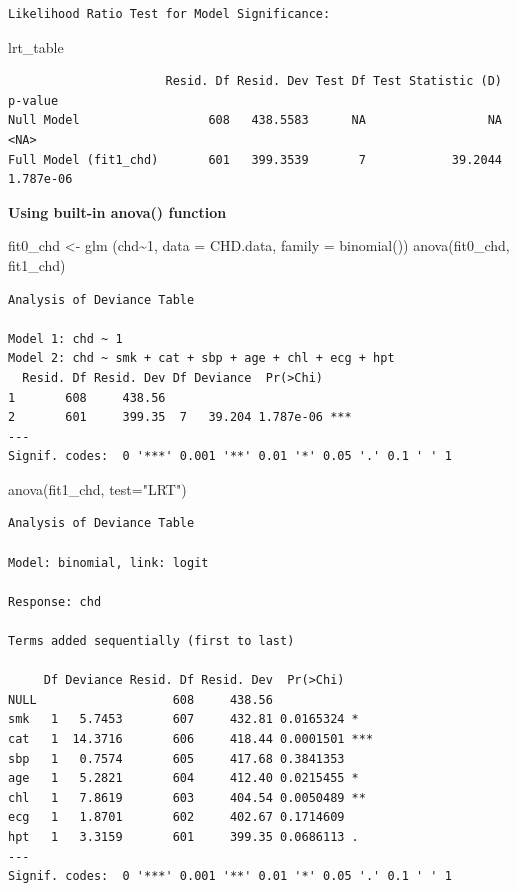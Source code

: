 \documentclass[
  letterpaper,
]{scrbook}
\newenvironment{Shaded}{\begin{snugshade}}{\end{snugshade}}
\newcommand{\AttributeTok}[1]{\textcolor[rgb]{0.40,0.45,0.13}{#1}}
\newcommand{\DecValTok}[1]{\textcolor[rgb]{0.68,0.00,0.00}{#1}}
\newcommand{\FunctionTok}[1]{\textcolor[rgb]{0.28,0.35,0.67}{#1}}
\newcommand{\NormalTok}[1]{\textcolor[rgb]{0.00,0.23,0.31}{#1}}
\newcommand{\OtherTok}[1]{\textcolor[rgb]{0.00,0.23,0.31}{#1}}
\newcommand{\SpecialCharTok}[1]{\textcolor[rgb]{0.37,0.37,0.37}{#1}}
\newcommand{\StringTok}[1]{\textcolor[rgb]{0.13,0.47,0.30}{#1}}
\begin{document}
\begin{verbatim}
Likelihood Ratio Test for Model Significance:
\end{verbatim}

\begin{Shaded}
\begin{Highlighting}[]
\NormalTok{lrt\_table}
\end{Highlighting}
\end{Shaded}

\begin{verbatim}
                      Resid. Df Resid. Dev Test Df Test Statistic (D)   p-value
Null Model                  608   438.5583      NA                 NA      <NA>
Full Model (fit1_chd)       601   399.3539       7            39.2044 1.787e-06
\end{verbatim}

\textbf{Using built-in anova() function}

\begin{Shaded}
\begin{Highlighting}[]
\NormalTok{fit0\_chd }\OtherTok{\textless{}{-}} \FunctionTok{glm}\NormalTok{ (chd}\SpecialCharTok{\textasciitilde{}}\DecValTok{1}\NormalTok{, }\AttributeTok{data =}\NormalTok{ CHD.data, }\AttributeTok{family =} \FunctionTok{binomial}\NormalTok{())}
\FunctionTok{anova}\NormalTok{(fit0\_chd, fit1\_chd)}
\end{Highlighting}
\end{Shaded}

\begin{verbatim}
Analysis of Deviance Table

Model 1: chd ~ 1
Model 2: chd ~ smk + cat + sbp + age + chl + ecg + hpt
  Resid. Df Resid. Dev Df Deviance  Pr(>Chi)    
1       608     438.56                          
2       601     399.35  7   39.204 1.787e-06 ***
---
Signif. codes:  0 '***' 0.001 '**' 0.01 '*' 0.05 '.' 0.1 ' ' 1
\end{verbatim}

\begin{Shaded}
\begin{Highlighting}[]
\FunctionTok{anova}\NormalTok{(fit1\_chd, }\AttributeTok{test=}\StringTok{"LRT"}\NormalTok{)}
\end{Highlighting}
\end{Shaded}

\begin{verbatim}
Analysis of Deviance Table

Model: binomial, link: logit

Response: chd

Terms added sequentially (first to last)

     Df Deviance Resid. Df Resid. Dev  Pr(>Chi)    
NULL                   608     438.56              
smk   1   5.7453       607     432.81 0.0165324 *  
cat   1  14.3716       606     418.44 0.0001501 ***
sbp   1   0.7574       605     417.68 0.3841353    
age   1   5.2821       604     412.40 0.0215455 *  
chl   1   7.8619       603     404.54 0.0050489 ** 
ecg   1   1.8701       602     402.67 0.1714609    
hpt   1   3.3159       601     399.35 0.0686113 .  
---
Signif. codes:  0 '***' 0.001 '**' 0.01 '*' 0.05 '.' 0.1 ' ' 1
\end{verbatim}
\end{document}
